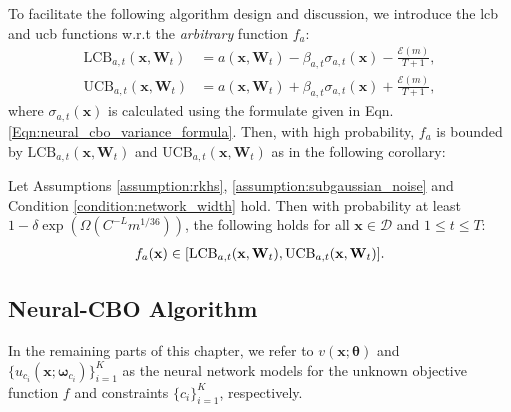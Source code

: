 To facilitate the following algorithm design and discussion, we introduce the \acf{lcb} and \acf{ucb} functions w.r.t the \textit{arbitrary} function $f_a$: 
\begin{align*}
\text{LCB}_{a,t}(\mathbf{x}, \mathbf{W}_{t}) &= a(\mathbf{x}, \mathbf{W}_{t}) - \beta_{a,t} \sigma_{a,t} (\mathbf{x}) - \frac{\mathcal{E}(m)}{T+1},
\\
\text{UCB}_{a,t}(\mathbf{x}, \mathbf{W}_{t}) &= a(\mathbf{x}, \mathbf{W}_{t}) + \beta_{a,t} \sigma_{a,t} (\mathbf{x}) + \frac{\mathcal{E}(m)}{T+1},  
\end{align*}
where $\sigma_{a,t}(\mathbf{x})$ is calculated using the formulate given in Eqn. \ref{Eqn:neural_cbo_variance_formula}. Then, with high probability,  $f_a$ is bounded by $\text{LCB}_{a,t}(\mathbf{x}, \mathbf{W}_{t})$ and $\text{UCB}_{a,t}(\mathbf{x}, \mathbf{W}_{t})$ as in the following corollary:
\begin{corollary}
\label{corrolary:f_in_lcb_ucb}
Let Assumptions \ref{assumption:rkhs}, \ref{assumption:subgaussian_noise} and Condition \ref{condition:network_width} hold. Then with probability at least $1 - \delta \exp (\Omega(C^{-L} m^{1/36}))$, the following holds for all $\mathbf{x} \in \mathcal{D}$
and $1 \le t \le T$:
\begin{align*}
    f_a (\mathbf{x}) \in [\textnormal{LCB}_{a,t}(\mathbf{x}, \mathbf{W}_{t}), \textnormal{UCB}_{a,t}(\mathbf{x}, \mathbf{W}_{t})].
\end{align*}
\end{corollary}
\subsection{Neural-CBO Algorithm}
In the remaining parts of this chapter, we refer to $v(\mathbf{x}; \boldsymbol{\theta})$ and $\{u_{c_i}(\mathbf{x}; \boldsymbol{\omega}_{c_i})\}_{i=1}^K$ as the neural network models for the unknown objective function $f$ and constraints $\{c_i\}_{i=1}^K$, respectively. 

